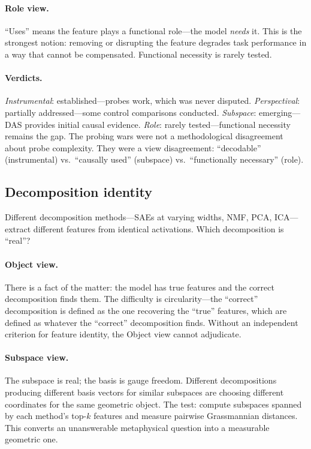 \documentclass{article}
\begin{document}
\paragraph{Role view.}
``Uses'' means the feature plays a functional role---the model
\emph{needs} it. This is the strongest notion: removing or disrupting
the feature degrades task performance in a way that cannot be compensated.
Functional necessity is rarely tested.

\paragraph{Verdicts.}
\emph{Instrumental}: established---probes work, which was never disputed.
\emph{Perspectival}: partially addressed---some control comparisons
conducted.
\emph{Subspace}: emerging---DAS provides initial causal evidence.
\emph{Role}: rarely tested---functional necessity remains the gap.
The probing wars were not a methodological disagreement about probe
complexity. They were a view disagreement: ``decodable''
(instrumental) vs.\ ``causally used'' (subspace) vs.\ ``functionally
necessary'' (role).


\subsection{Decomposition identity}\label{app:cs_decomp}

Different decomposition methods---SAEs at varying widths, NMF, PCA,
ICA---extract different features from identical activations. Which
decomposition is ``real''?

\paragraph{Object view.}
There is a fact of the matter: the model has true features and the
correct decomposition finds them. The difficulty is circularity---the
``correct'' decomposition is defined as the one recovering the ``true''
features, which are defined as whatever the ``correct'' decomposition
finds. Without an independent criterion for feature identity, the Object
view cannot adjudicate.

\paragraph{Subspace view.}
The subspace is real; the basis is gauge freedom. Different
decompositions producing different basis vectors for similar subspaces
are choosing different coordinates for the same geometric object. The
test: compute subspaces spanned by each method's top-$k$ features and
measure pairwise Grassmannian distances. This converts an unanswerable
metaphysical question into a measurable geometric one.
\end{document}

